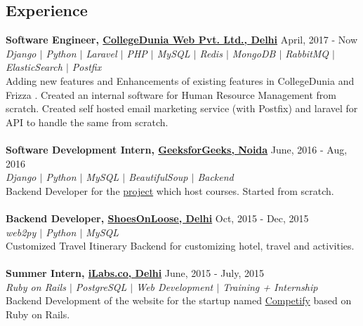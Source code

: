 \documentclass[margin, centered]{res}
\begin{document}
\begin{resume}
\section{Experience}
\textbf{Software Engineer, \href{https://collegedunia.com}{CollegeDunia Web Pvt. Ltd., Delhi}} \hfill April, 2017 - Now\\
\emph{\color{BlueViolet}Django $\vert$ Python $\vert$ Laravel $\vert$ PHP $\vert$ MySQL $\vert$ Redis $\vert$ MongoDB $\vert$ RabbitMQ $\vert$ ElasticSearch $\vert$ Postfix } \\
Adding new features and Enhancements of existing features in CollegeDunia and Frizza . Created an internal software for Human Resource Management from scratch. Created self hosted email marketing service (with Postfix) and laravel for API to handle the same from scratch.\\
\\
\textbf{Software Development Intern, \href{http://www.geeksforgeeks.org}{GeeksforGeeks, Noida}} \hfill June, 2016 - Aug, 2016\\
\emph{\color{BlueViolet}Django $\vert$ Python $\vert$ MySQL $\vert$ BeautifulSoup $\vert$ Backend}  \\
Backend Developer for the \href{http://courses.geeksforgeeks.org}{project} which host courses. Started from scratch.  \\
\\
\textbf{Backend Developer, \href {http://shoesonloose.com/}{ShoesOnLoose, Delhi}} \hfill Oct, 2015 - Dec, 2015 \\
\emph{\color{BlueViolet}web2py $\vert$ Python $\vert$ MySQL} \\
Customized Travel Itinerary Backend for customizing hotel, travel and activities. \\
\\
\textbf{Summer Intern, \href{http://www.ilabs.co}{iLabs.co, Delhi}} \hfill June, 2015 - July, 2015 \\
\emph{\color{BlueViolet}Ruby on Rails $\vert$ PostgreSQL $\vert$ Web Development $\vert$ Training + Internship} \\
Backend Development of the website for the startup named \href {http://competifyin.herokuapp.com} {Competify} based on Ruby on Rails. 

\end{resume}
\end{document}
